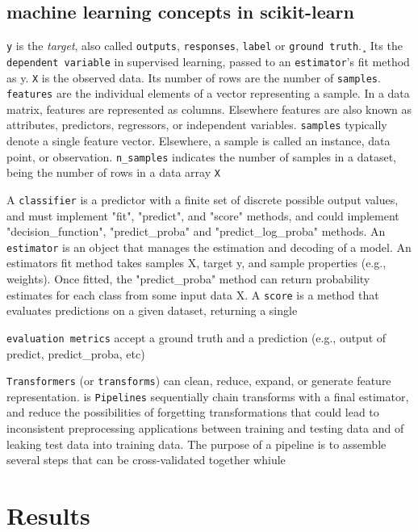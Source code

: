 \subsection{machine learning concepts in scikit-learn}

\texttt{y} is the \textit{target}, also called \texttt{outputs}, \texttt{responses}, \texttt{label} or \texttt{ground truth}.¸ Its the \texttt{dependent variable} in supervised learning, passed to an \texttt{estimator}'s fit method as y.
\texttt{X} is the observed data. Its number of rows are the number of \texttt{samples}.
\texttt{features} are the individual elements of a vector representing a sample. In a data matrix, features are represented as columns. Elsewhere features are also known as attributes, predictors, regressors, or independent variables.
\texttt{samples} typically denote a single feature vector. Elsewhere, a sample is called an instance, data point, or observation. \texttt{n\_samples} indicates the number of samples in a dataset, being the number of rows in a data array \texttt{X}


A \texttt{classifier} is a predictor with a finite set of discrete possible output values, and must implement "fit", "predict", and "score" methods, and could implement "decision\_function", "predict\_proba" and "predict\_log\_proba" methods.
An \texttt{estimator} is an object that manages the estimation and decoding of a model. An estimators fit method takes samples X, target y, and sample properties (e.g., weights). Once fitted, the "predict\_proba" method can return probability estimates for each class from some input data X. A \texttt{score} is a method that evaluates predictions on a given dataset, returning a single

\texttt{evaluation metrics} accept a ground truth and a prediction (e.g., output of predict, predict\_proba, etc)

\texttt{Transformers} (or \texttt{transforms}) can clean, reduce, expand, or generate feature representation.
 is
\texttt{Pipelines} sequentially chain transforms with a final estimator, and reduce the possibilities of forgetting transformations that could lead to inconsistent preprocessing applications between training and testing data and of leaking test data into training data. The purpose of a pipeline is to assemble several steps that can be cross-validated together whiule

\section{Results}
\pagebreak

